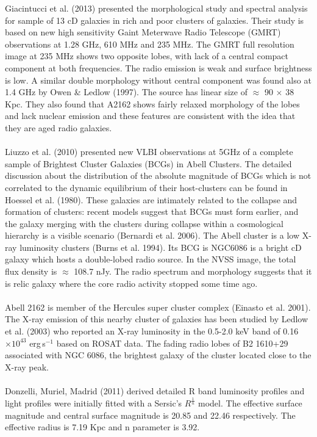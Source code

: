 Giacintucci et al. (2013) presented the morphological study and spectral analysis for sample of 13 cD galaxies in rich and poor clusters of galaxies. Their study is based on new high sensitivity Gaint Meterwave Radio Telescope (GMRT) observations at 1.28 GHz, 610 MHz and 235 MHz. The GMRT full resolution image at 235 MHz shows two opposite lobes, with lack of a central compact component at both frequencies. The radio emission is weak and surface brightness is low. A similar double morphology without central component was found also at 1.4 GHz by Owen \& Ledlow (1997). The source has linear size of $\approx$ 90 $\times$ 38 Kpc. They also found that A2162 shows fairly relaxed morphology of the lobes and lack nuclear emission and these features are consistent with the idea that they are aged radio galaxies.\\\\
Liuzzo et al. (2010) presented new VLBI observations at 5GHz of a complete sample of Brightest Cluster Galaxies (BCGs) in Abell Clusters. The detailed discussion about the distribution of the absolute magnitude of BCGs which is not correlated to the dynamic equilibrium of their host-clusters can be found in Hoessel et al. (1980). These galaxies are intimately related to the collapse and formation of clusters: recent models suggest that BCGs must form earlier, and the galaxy merging with the clusters during collapse within a cosmological hierarchy is a visible scenario (Bernardi et al. 2006). The Abell cluster is a low X-ray luminosity clusters (Burns  et al. 1994). Its BCG is NGC6086 is a bright cD galaxy which hosts a double-lobed radio source. In the NVSS image, the total flux density is $\approx$ 108.7 nJy. The radio spectrum and morphology suggests that it is relic galaxy where the core radio activity stopped some time ago.\\\\
Abell 2162 is member of the Hercules super cluster complex (Einasto et al. 2001). The X-ray emission of this nearby cluster of galaxies has been studied by Ledlow et al. (2003) who reported an X-ray luminosity in the 0.5-2.0 keV band of 0.16 $\times 10^{43}$ erg\,s$^{-1}$ based on ROSAT data. The fading radio lobes of B2 1610+29 associated with NGC 6086, the brightest galaxy of the cluster located close to the X-ray peak.\\\\
Donzelli, Muriel, Madrid (2011) derived detailed R band luminosity profiles and light profiles were initially fitted with a Sersic's $R^{\frac{1}{n}}$ model. The effective surface magnitude and central surface magnitude is 20.85 and 22.46 respectively. The effective radius is 7.19 Kpc and n parameter is 3.92.\\\\
